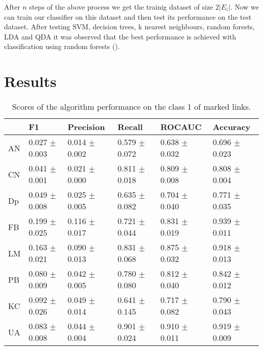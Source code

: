 \documentclass{llncs}
\begin{document}
After $n$ steps of the above process we get the trainig dataset of size $2 |E_i|$. Now we can train our classifier on this dataset and then test its performance on the test dataset. After testing SVM, decision trees, k nearest neighbours, random forests, LDA and QDA it was observed that the best performance is achieved with classification using random forests ().
%
\section{Results}
%
\setlength{\tabcolsep}{5pt}
\renewcommand{\arraystretch}{1.5}
\begin{table}
\begin{center}
\caption{Scores of the algorithm performance on the class 1 of marked links.}
\begin{tabular}{| l | l | l | l | l | l |}
\hline
& F1 & Precision & Recall & ROCAUC & Accuracy  \\ \hline
AN & 0.027 $\pm$ 0.003 & 0.014 $\pm$ 0.002 & 0.579 $\pm$ 0.072 & 0.638 $\pm$ 0.032 & 0.696 $\pm$ 0.023  \\ \hline
CN & 0.041 $\pm$ 0.001 & 0.021 $\pm$ 0.000 & 0.811 $\pm$ 0.018 & 0.809 $\pm$ 0.008 & 0.808 $\pm$ 0.004  \\ \hline
Dp & 0.049 $\pm$ 0.008 & 0.025 $\pm$ 0.005 & 0.635 $\pm$ 0.082 & 0.704 $\pm$ 0.040 & 0.771 $\pm$ 0.035  \\ \hline
FB & 0.199 $\pm$ 0.025 & 0.116 $\pm$ 0.017 & 0.721 $\pm$ 0.044 & 0.831 $\pm$ 0.019 & 0.939 $\pm$ 0.011  \\ \hline
LM & 0.163 $\pm$ 0.021 & 0.090 $\pm$ 0.013 & 0.831 $\pm$ 0.068 & 0.875 $\pm$ 0.032 & 0.918 $\pm$ 0.013 \\ \hline
PB & 0.080 $\pm$ 0.009 & 0.042 $\pm$ 0.005 & 0.780 $\pm$ 0.080 & 0.812 $\pm$ 0.040 & 0.842 $\pm$ 0.012  \\ \hline
KC & 0.092 $\pm$ 0.026 & 0.049 $\pm$ 0.014 & 0.641 $\pm$ 0.145 & 0.717 $\pm$ 0.082 & 0.790 $\pm$  0.043 \\ \hline
UA & 0.083 $\pm$ 0.008 & 0.044 $\pm$ 0.004 & 0.901 $\pm$ 0.024 & 0.910 $\pm$ 0.011 & 0.919 $\pm$ 0.009  \\ 
\hline
\end{tabular}
\end{center}
\end{table}
%
\end{document}
